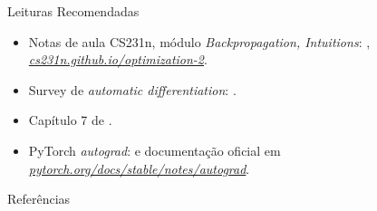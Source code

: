\documentclass[aspectratio=169,xcolor=dvipsnames]{beamer}
\begin{document}
  \begin{frame}{Leituras Recomendadas}
    \leiturasize
    \sloppy
    \begin{itemize}
      \item Notas de aula CS231n, módulo \textit{Backpropagation, Intuitions}:
        ,
        \href{https://cs231n.github.io/optimization-2/}{\textit{cs231n.github.io/optimization-2}}.
      \item Survey de \textit{automatic differentiation}:
        .
      \item Capítulo 7 de .
      \item PyTorch \textit{autograd}:  e
        documentação oficial em
        \href{https://pytorch.org/docs/stable/notes/autograd.html}{\textit{pytorch.org/docs/stable/notes/autograd}}.
    \end{itemize}
  \end{frame}

  \begin{frame}[allowframebreaks]{Referências}
    \sloppy
    \printbibliography[heading=none]
  \end{frame}
\end{document}
